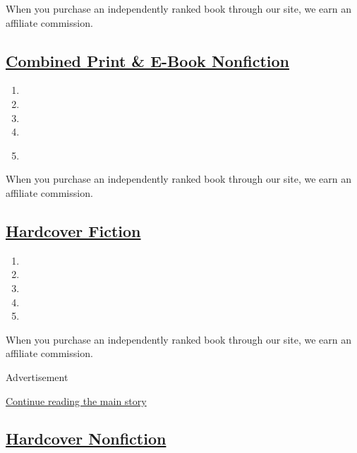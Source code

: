 When you purchase an independently ranked book through our site, we earn
an affiliate commission.

\hypertarget{combined-print--e-book-nonfiction}{%
\subsection{\texorpdfstring{\href{/books/best-sellers/combined-print-and-e-book-nonfiction/}{Combined
Print \& E-Book
Nonfiction}}{Combined Print \& E-Book Nonfiction}}\label{combined-print--e-book-nonfiction}}

\begin{enumerate}
\def\labelenumi{\arabic{enumi}.}
\tightlist
\item
\item
\item
\item
\item
  \href{https://www.nytimes3xbfgragh.onion/2019/08/20/books/review/how-to-be-an-antiracist-ibram-x-kendi.html}{}
\end{enumerate}

When you purchase an independently ranked book through our site, we earn
an affiliate commission.

\hypertarget{hardcover-fiction}{%
\subsection{\texorpdfstring{\href{/books/best-sellers/hardcover-fiction/}{Hardcover
Fiction}}{Hardcover Fiction}}\label{hardcover-fiction}}

\begin{enumerate}
\def\labelenumi{\arabic{enumi}.}
\tightlist
\item
\item
\item
\item
\item
\end{enumerate}

When you purchase an independently ranked book through our site, we earn
an affiliate commission.

Advertisement

\protect\hyperlink{after-mid1}{Continue reading the main story}

\hypertarget{hardcover-nonfiction}{%
\subsection{\texorpdfstring{\href{/books/best-sellers/hardcover-nonfiction/}{Hardcover
Nonfiction}}{Hardcover Nonfiction}}\label{hardcover-nonfiction}}

